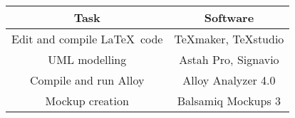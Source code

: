 \begin{center}
	
	\-\\
	\begin{tabular}{*{2}{c}}
		\toprule
		Task & Software \\
		\midrule
		Edit and compile \LaTeX\ code & TeXmaker, TeXstudio\\
		UML modelling & Astah Pro, Signavio\\
		Compile and run Alloy & Alloy Analyzer 4.0\\
		Mockup creation & Balsamiq Mockups 3\\
		\bottomrule
	\end{tabular}
\end{center}